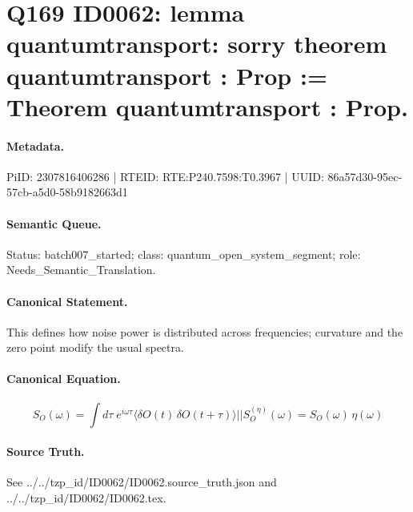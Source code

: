 \section*{Q169 ID0062: lemma quantumtransport: sorry theorem quantumtransport : Prop := Theorem quantumtransport : Prop.}
\paragraph{Metadata.}
PiID: 2307816406286 | RTEID: RTE:P240.7598:T0.3967 | UUID: 86a57d30-95ec-57cb-a5d0-58b9182663d1

\paragraph{Semantic Queue.}
Status: batch007\_started; class: quantum\_open\_system\_segment; role: Needs\_Semantic\_Translation.

\paragraph{Canonical Statement.}
This defines how noise power is distributed across frequencies; curvature and the zero point modify the usual spectra.

\paragraph{Canonical Equation.}
\[
S_{O}(\omega) = \int d\tau\; e^{i\omega\tau} \langle \delta O(t)\,\delta O(t+\tau)\rangle || S_{O}^{(\eta)}(\omega) = S_{O}(\omega)\,\eta(\omega)
\]

\paragraph{Source Truth.}
See ../../tzp\_id/ID0062/ID0062.source\_truth.json and ../../tzp\_id/ID0062/ID0062.tex.
